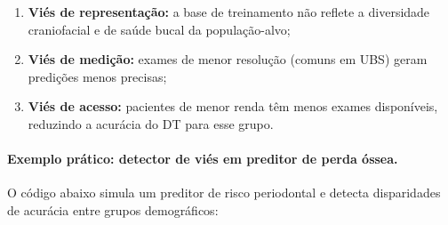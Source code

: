 \begin{enumerate}
    \item \textbf{Viés de representação:} a base de treinamento não reflete a diversidade craniofacial e de saúde bucal da população-alvo;
    \item \textbf{Viés de medição:} exames de menor resolução (comuns em UBS) geram predições menos precisas;
    \item \textbf{Viés de acesso:} pacientes de menor renda têm menos exames disponíveis, reduzindo a acurácia do DT para esse grupo.
\end{enumerate}

\paragraph{Exemplo prático: detector de viés em preditor de perda óssea.}
O código abaixo simula um preditor de risco periodontal e detecta disparidades de acurácia entre grupos demográficos:

